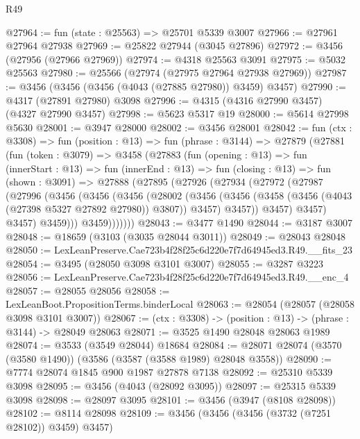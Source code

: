 \begin{lexlean}{R49}
\begin{coremodule}
@27964 := fun (state : @25563) => @25701 @5339 @3007
@27966 := @27961 @27964 @27938
@27969 := @25822 @27944 (@3045 @27896)
@27972 := @3456 (@27956 (@27966 @27969))
@27974 := @4318 @25563 @3091
@27975 := @5032 @25563
@27980 := @25566 (@27974 (@27975 @27964 @27938 @27969))
@27987 := @3456 (@3456 (@3456 (@4043 (@27885 @27980)) @3459) @3457)
@27990 := @4317 (@27891 @27980) @3098
@27996 := @4315 (@4316 @27990 @3457) (@4327 @27990 @3457)
@27998 := @5623 @5317 @19
@28000 := @5614 @27998 @5630
@28001 := @3947 @28000
@28002 := @3456 @28001
@28042 := fun (ctx : @3308) =>
  fun (position : @13) =>
  fun (phrase : @3144) =>
  @27879
    (@27881
      (fun (token : @3079) =>
      @3458
        (@27883
          (fun (opening : @13) =>
          fun (innerStart : @13) =>
          fun (innerEnd : @13) =>
          fun (closing : @13) =>
          fun (shown : @3091) =>
          @27888
            (@27895
              (@27926
                (@27934
                  (@27972
                    (@27987
                      (@27996
                        (@3456
                          (@3456
                            (@3456
                              (@28002
                                (@3456
                                  (@3456
                                    (@3458 (@3456 (@4043 (@27398 @5327 @27892 @27980)) @3807))
                                    @3457)
                                  @3457))
                              @3457)
                            @3457)
                          @3457)
                        @3459)))
                  @3459)))))))
@28043 := @3477 @1490
@28044 := @3187 @3007
@28048 := @18659 (@3103 (@3035 @28044 @3011))
@28049 := @28043 @28048
@28050 := LexLeanPreserve.Cae723b4f28f25c6d220e7f7d64945ed3.R49.__fits_23
@28054 := @3495 (@28050 @3098 @3101 @3007)
@28055 := @3287 @3223
@28056 := LexLeanPreserve.Cae723b4f28f25c6d220e7f7d64945ed3.R49.__enc_4
@28057 := @28055 @28056
@28058 := LexLeanBoot.PropositionTerms.binderLocal
@28063 := @28054 (@28057 (@28058 @3098 @3101 @3007))
@28067 := (ctx : @3308) -> (position : @13) -> (phrase : @3144) -> @28049 @28063
@28071 := @3525 @1490 @28048 @28063 @1989
@28074 := @3533 (@3549 @28044) @18684
@28084 := @28071 @28074 (@3570 (@3580 @1490)) (@3586 (@3587 (@3588 @1989) @28048 @3558))
@28090 := @7774 @28074 @1845 @900 @1987 @27878 @7138
@28092 := @25310 @5339 @3098
@28095 := @3456 (@4043 (@28092 @3095))
@28097 := @25315 @5339 @3098
@28098 := @28097 @3095
@28101 := @3456 (@3947 (@8108 @28098))
@28102 := @8114 @28098
@28109 := @3456 (@3456 (@3456 (@3732 (@7251 @28102)) @3459) @3457)

\end{coremodule}
\end{lexlean}
